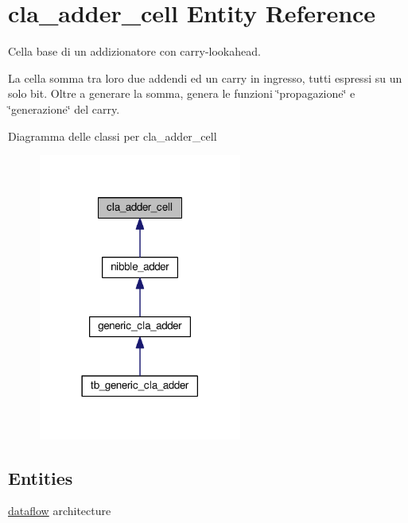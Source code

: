 \hypertarget{classcla__adder__cell}{\section{cla\+\_\+adder\+\_\+cell Entity Reference}
\label{classcla__adder__cell}
}


Cella base di un addizionatore con carry-\/lookahead.

La cella somma tra loro due addendi ed un carry in ingresso, tutti espressi su un solo bit. Oltre a generare la somma, genera le funzioni \char`\"{}propagazione\char`\"{} e \char`\"{}generazione\char`\"{} del carry.  




Diagramma delle classi per cla\+\_\+adder\+\_\+cell\nopagebreak
\begin{figure}[H]
\begin{center}
\leavevmode
\includegraphics[width=189pt]{classcla__adder__cell__inherit__graph}
\end{center}
\end{figure}
\subsection*{Entities}
\begin{DoxyCompactItemize}
\item 
\hyperlink{classcla__adder__cell_1_1dataflow}{dataflow} architecture
\end{DoxyCompactItemize}
